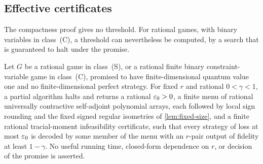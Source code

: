\subsection{Effective certificates}\label{sec:effective}

The compactness proof gives no threshold. For rational games, with binary variables in class~(C), a threshold can
nevertheless be computed, by a search that is guaranteed to halt under the promise.

\begin{theorem}\label{thm:effective}
Let $G$ be a rational game in class~(S), or a rational finite binary constraint-variable game in class~(C), promised to
have finite-dimensional quantum value one and no finite-dimensional perfect strategy. For fixed $r$ and rational
$0<\gamma<1$, a partial algorithm halts and returns a rational $\varepsilon_0>0$, a finite menu of rational universally
contractive self-adjoint polynomial arrays, each followed by local sign rounding and the fixed signed regular isometries
of \cref{lem:fixed-size}, and a finite rational tracial-moment infeasibility certificate, such that every strategy of loss
at most $\varepsilon_0$ is decoded by some member of the menu with an $r$-pair output of fidelity at least $1-\gamma$. No useful
running time, closed-form dependence on $r$, or decision of the promise is asserted.
\end{theorem}

